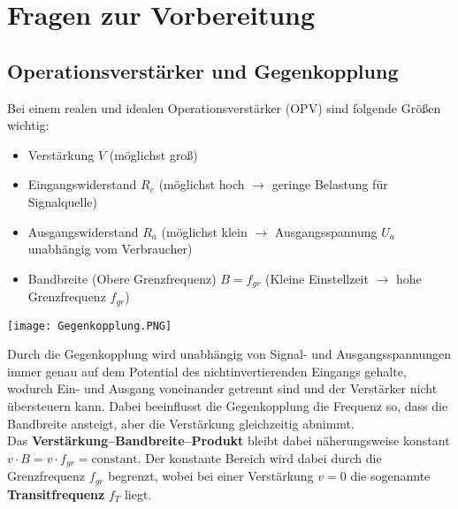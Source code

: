 

\chapter{Fragen zur Vorbereitung}
\label{chap:fvz}

\section{Operationsverstärker und Gegenkopplung}
\label{sec:dataOPV}
Bei einem realen und idealen Operationsverstärker (OPV) sind folgende Größen wichtig:
\begin{itemize}
    \item Verstärkung $V$ (möglichst groß)
    \item Eingangswiderstand $R_e$ (möglichst hoch $\rightarrow$ geringe Belastung für Signalquelle)
    \item Ausgangswiderstand $R_a$ (möglichst klein $\rightarrow$ Ausgangsspannung $U_a$ unabhängig vom Verbraucher)
    \item Bandbreite (Obere Grenzfrequenz) $B=f_{gr}$ (Kleine Einstellzeit $\rightarrow$ hohe Grenzfrequenz $f_{gr}$)
\end{itemize}
\begin{center}
    \texttt{[image: Gegenkopplung.PNG]}
\end{center}
Durch die Gegenkopplung wird unabhängig von Signal- und Ausgangsspannungen immer genau auf dem Potential des nichtinvertierenden Eingangs gehalte, wodurch Ein- und Ausgang voneinander getrennt sind und der Verstärker nicht übersteuern kann. Dabei beeinflusst die Gegenkopplung die Frequenz so, dass die Bandbreite ansteigt, aber die Verstärkung gleichzeitig abnimmt.\\
Das \textbf{Verstärkung–Bandbreite–Produkt} bleibt dabei näherungsweise konstant $v\cdot B = v \cdot f_{gr} = \text{constant}$. Der konstante Bereich wird dabei durch die Grenzfrequenz $f_{gr}$ begrenzt, wobei bei einer Verstärkung $v=0$ die sogenannte \textbf{Transitfrequenz} $f_T$ liegt. %
\newpage

